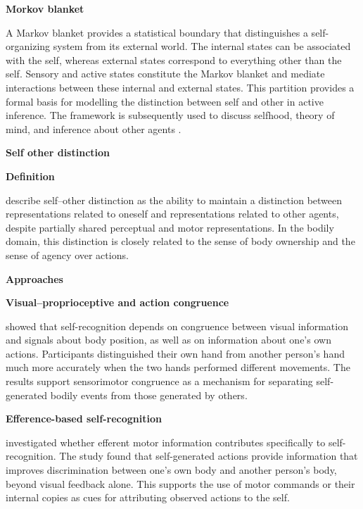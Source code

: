 \documentclass{book}
\providecommand{\ProjectDeepHeading}[2]{%
    \par\medskip\noindent\textbf{#2}\par\smallskip
}
\begin{document}
\ProjectDeepHeading{6}{Morkov blanket}


A Markov blanket provides a statistical boundary that distinguishes a self-organizing system from its external world. The internal states can be associated with the self, whereas external states correspond to everything other than the self. Sensory and active states constitute the Markov blanket and mediate interactions between these internal and external states. This partition provides a formal basis for modelling the distinction between self and other in active inference. The framework is subsequently used to discuss selfhood, theory of mind, and inference about other agents \cite{demekas-2020-an-investigation-of-the-free-energy-principle-for-emotion-recognition}.

\ProjectDeepHeading{6}{Self other distinction}


\ProjectDeepHeading{9}{Definition}
         \cite{decety-2003-shared-representations-between-self-and-other,tsakiris-2007-on-agency-and-body-ownership} describe self--other distinction as the ability to maintain a distinction between representations related to oneself and representations related to other agents, despite partially shared perceptual and motor representations. In the bodily domain, this distinction is closely related to the sense of body ownership and the sense of agency over actions.

   \ProjectDeepHeading{9}{Approaches}

         \ProjectDeepHeading{11}{Visual--proprioceptive and action congruence}
            \cite{van-den-bos-2002-sense-of-body-and-sense-of-action-both-contribute-to-self-recognition} showed that self-recognition depends on congruence between visual information and signals about body position, as well as on information about one's own actions. Participants distinguished their own hand from another person's hand much more accurately when the two hands performed different movements. The results support sensorimotor congruence as a mechanism for separating self-generated bodily events from those generated by others.

         \ProjectDeepHeading{11}{Efference-based self-recognition}
            \cite{tsakiris-2005-a-specific-role-for-efferent-information-in-self-recognition} investigated whether efferent motor information contributes specifically to self-recognition. The study found that self-generated actions provide information that improves discrimination between one's own body and another person's body, beyond visual feedback alone. This supports the use of motor commands or their internal copies as cues for attributing observed actions to the self.
\end{document}
